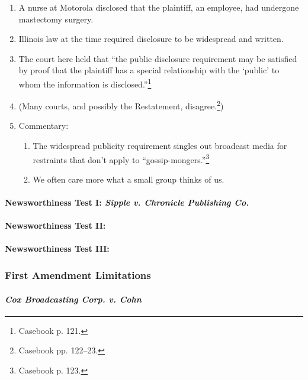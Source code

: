 \begin{enumerate}
    \item A nurse at Motorola disclosed that the plaintiff, an employee, had 
    undergone mastectomy surgery.
    \item Illinois law at the time required disclosure to be widespread and 
    written.
    \item The court here held that ``the public disclosure requirement may be 
    satisfied by proof that the plaintiff has a special relationship with the 
    `public' to whom the information is disclosed.''\footnote{Casebook p. 121.}
    \item (Many courts, and possibly the Restatement, 
    disagree.\footnote{Casebook pp. 122--23.})
    \item Commentary:
    \begin{enumerate}
        \item The widespread publicity requirement singles out broadcast media 
        for restraints that don't apply to ``gossip-mongers.''\footnote{Casebook 
        p. 123.}
        \item We often care more what a small group thinks of us.
    \end{enumerate}
\end{enumerate}

\paragraph{Newsworthiness Test I: \emph{Sipple v. Chronicle Publishing Co.}}


\paragraph{Newsworthiness Test II: \emph{}}


\paragraph{Newsworthiness Test III: \emph{}}


\subsubsection{First Amendment Limitations}

\paragraph{\emph{Cox Broadcasting Corp. v. Cohn}}

